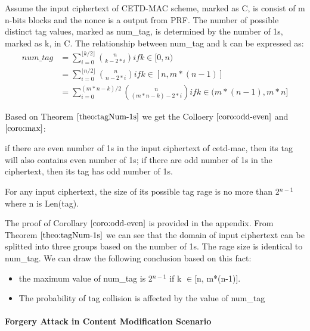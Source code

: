 \begin{theorem}\label{theo:tagNum-1s}
Assume the input ciphertext of CETD-MAC scheme, marked as C,  is consist of m n-bits blocks and the nonce is a output from PRF. The number of possible distinct tag values, marked as num\_tag, is determined by the number of 1s, marked as k, in C. The relationship between num\_tag and k can be expressed as:
\begin{equation}\label{equ:tagNum-1s}
\begin{split}
num\_tag &= \sum_{i=0}^{\lfloor k/2 \rfloor} \binom{n}{k-2*i} if k \in [0,n)\\ 
		& =\sum_{i=0}^{\lfloor n/2 \rfloor} \binom{n}{n-2*i} if k \in [n,m*(n-1)]\\
		& = \sum_{i=0}^{(m*n-k)/2} \binom{n}{(m*n - k)-2*i} if k \in (m*(n-1),m*n] 	 
\end{split}
\end{equation}
\end{theorem}
Based on Theorem $\ref{theo:tagNum-1s}$ we get the Colloery $\ref{coro:odd-even}$ and $\ref{coro:max}$:
\begin{corollary} \label{coro:odd-even}
if there are even number of 1s in the input ciphertext of cetd-mac, then its tag will also contains even number of 1s; if there are odd number of 1s in the ciphertext, then its tag has odd number of 1s.
\end{corollary}
\begin{corollary} \label{coro:max}
For any input ciphertext, the size of its possible tag rage is no more than 2$^{n-1}$ where n is Len(tag).
\end{corollary}

The proof of Corollary $\ref{coro:odd-even}$ is provided in the appendix. 
From Theorem $\ref{theo:tagNum-1s}$ we can see that the domain of input ciphertext can be splitted into three groups based on the number of 1s. The rage size is identical to num\_tag. We can draw the following conclusion based on this fact:
\begin{itemize}
	\item the maximum value of num\_tag is 2$^{n-1}$ if k $\in$[n, m*(n-1)]. 
	\item The probability of tag collision is affected by the value of num\_tag
\end{itemize}
\paragraph{Forgery Attack in Content Modification Scenario}


